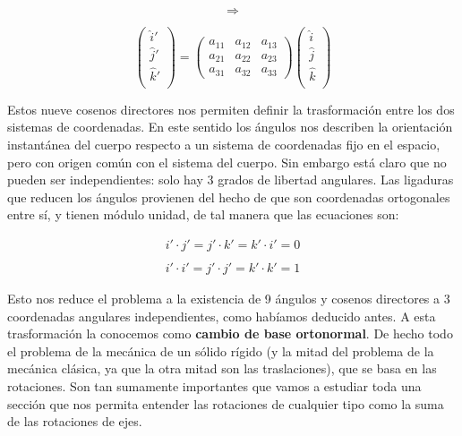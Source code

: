 \documentclass[12pt,a4paper]{book}
\begin{document}
$$ \Longrightarrow $$



\begin{equation}
\begin{pmatrix}
\widehat{i}' \\
\widehat{j}' \\
\widehat{k}' \\
\end{pmatrix}
=
\begin{pmatrix}
a_{1 1 } &
a_{1 2 } &
a_{1 3 } \\ 
a_{2 1 } &
a_{2 2 } &
a_{2 3 } \\ 
a_{3 1 } &
a_{3 2 } &
a_{3 3 } 
\end{pmatrix}
\begin{pmatrix}
\widehat{i} \\
\widehat{j} \\
\widehat{k} \\
\end{pmatrix} \label{Ec:3.3-matrizcambiobase1}
\end{equation}

Estos nueve cosenos directores nos permiten definir la trasformación entre los dos sistemas de coordenadas. En este sentido los ángulos nos describen la orientación instantánea del cuerpo respecto a un sistema de coordenadas fijo en el espacio, pero con origen común con el sistema del cuerpo. Sin embargo está claro que no pueden ser independientes: solo hay 3 grados de libertad angulares. Las ligaduras que reducen los ángulos provienen del hecho de que son coordenadas ortogonales entre sí, y tienen módulo unidad, de tal manera que las ecuaciones son:

\begin{equation}
\begin{array}{l}
i' \cdot j' = j' \cdot k' = k' \cdot i'  = 0 \\ \\
i' \cdot i' = j' \cdot j' = k' \cdot k' = 1 
\end{array}
\end{equation}

Esto nos reduce el problema a la existencia de 9 ángulos y cosenos directores a 3 coordenadas angulares independientes, como habíamos deducido antes. A esta trasformación la conocemos como \textbf{cambio de base ortonormal}. De hecho todo el problema de la mecánica de un sólido rígido (y la mitad del problema de la mecánica clásica, ya que la otra mitad son las traslaciones), que se basa en las rotaciones. Son tan sumamente importantes que vamos a estudiar toda una sección que nos permita entender las rotaciones de cualquier tipo como la suma de las rotaciones de ejes. 
\end{document}
